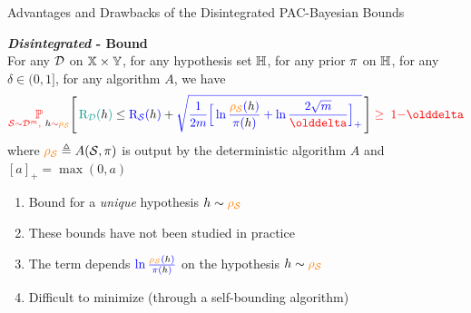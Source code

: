 \documentclass{slides}
\begin{document}
\begin{xframe}{Advantages and Drawbacks of the Disintegrated PAC-Bayesian Bounds}

\begin{xblock}{}
\textbf{{\it Disintegrated} - Bound} {\scriptsize\citep[Example based on][]{RivasplataKuzborskijSzepesvariShaweTaylor2020}}\\

{\scriptsize For any $\D$ on $\X\times\Y$, for any hypothesis set $\H$, for any prior $\P$ on $\H$, for any $\delta\in(0, 1]$, for any algorithm $A$, we have}\\[-0.6cm]
\begin{align*}
\red{\PP_{\dS\sim\D^\m,\ \black{\h}\sim\AQ}}\Bigg[\, \green{\Risk_{\D}(\black{h})} \le \blue{\Risk_{\dS}(\black{h})} +  \blue{\sqrt{\frac{1}{2m}\Big[ \ln\frac{\AQ(\black{\h})}{\P(\black{\h})} +\ln\frac{2\sqrt{m}}{\delta}\Big]_{+}}} \,\Bigg]\red{\;\ge\; 1{-}\delta}
\end{align*}
{\small where $\AQ \defeq A(\dS, \P)$ is output by the deterministic algorithm $A$ and $[a]_+ = \max(0,a)$}
\end{xblock}

\vspace{-0.2cm}

\begin{redbox}{}
\begin{enumerate}
    \item {} Bound for a {\it unique} hypothesis $\h\sim\AQ$
    \item These bounds have not been studied in practice
    \item {} The term depends $\blue{\ln\frac{\AQ(\black{\h})}{\P(\black{\h})}}$ on the hypothesis $\h\sim\AQ$ 
    \item[\red{$\Rightarrow$}] Difficult to minimize (through a self-bounding algorithm)
\end{enumerate}
\end{redbox}
\end{xframe}

\end{document}
